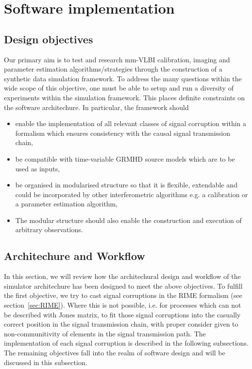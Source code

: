 \chapter{Software implementation}

\section{Design objectives}
Our primary aim is to test and research mm-VLBI calibration, imaging and parameter estimation algorithms/strategies through the construction of a synthetic data simulation framework. To address the many questions within the wide scope of this objective, one must be able to setup and run a diversity of experiments within the simulation framework. This places definite constraints on the software architechure. In particular, the framework should 


\begin{itemize}
 \item enable the implementation of all relevant classes of signal corruption within a formalism which ensures consistency with the causal signal transmission chain,
 \item be compatible with time-variable GRMHD source models which are to be used as inputs,
 \item be organised in modularised structure so that it is flexible, extendable and could be incorporated by other interferometric algorithms e.g. a calibration or a parameter estimation algorithm,
 \item The modular structure should also enable the construction and execution of arbitrary observations.
\end{itemize}

\section{Architechure and Workflow}
In this section, we will review how the architechural design and workflow of the simulator architechure has been designed to meet the above objectives. To fulfill the first objective, we try to cast signal corruptions in the RIME formalism (see section~\ref{sec:RIME}). Where this is not possible, i.e. for processes which can not be described with Jones matrix, to fit those signal corruptions into the casually correct position in the signal transmission chain, with proper consider given to non-communitivity of elements in the signal transmission path. The implementation of each signal corruption is described in the following subsections. The remaining objectives fall into the realm of software design and will be discussed in this subsection. 



